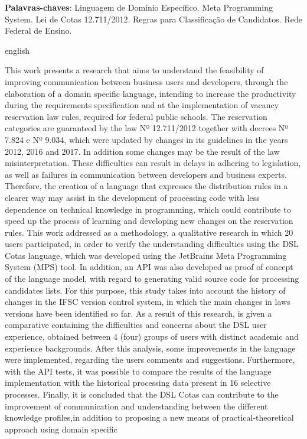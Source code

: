 \begin{resumo}[Resumo]

 \vspace{\onelineskip}
    
 \noindent
 \textbf{Palavras-chaves}: Linguagem de Domínio Específico. Meta Programming System. Lei de Cotas 12.711/2012. Regras para Classificação de Candidatos. Rede Federal de Ensino.
\end{resumo}



\begin{resumo}[Abstract]
\begin{otherlanguage*}{english}

 \noindent
This work presents a research that aims to understand the feasibility of improving communication between business users and developers, through the elaboration of a domain specific language, intending to increase the productivity during the requirements specification and at the implementation of vacancy reservation law rules, required for federal public schools. The reservation categories are guaranteed by the law Nº 12.711/2012 together with decrees Nº 7.824 e Nº 9.034, which were updated by changes in its guidelines in the years 2012, 2016 and 2017. In addition some changes may be the result of the law misinterpretation. These difficulties can result in delays in adhering to legislation, as well as failures in communication between developers and business experts. Therefore, the creation of a language that expresses the distribution rules in a clearer way may assist in the development of processing code with less dependence on technical knowledge in programming, which could contribute to speed up the process of learning and developing new changes on the reservation rules. This work addressed as a methodology, a qualitative research in which 20 users participated, in order to verify the understanding difficulties using the DSL Cotas language, which was developed using the JetBrains Meta Programming System (MPS) tool. In addition, an API was also developed as proof of concept of the language model, with regard to generating valid source code for processing candidates lists. For this purpose, this study takes into account the history of changes in the \gls{IFSC} version control system, in which the main changes in laws versions have been identified so far. As a result of this research, is given a comparative containing the difficulties and concerns about the DSL user experience, obtained between 4 (four) groups of users with distinct academic and experience backgrounds. After this analysis, some improvements in the language were implemented, regarding the users comments and suggestions. Furthermore, with the \gls{API} tests, it was possible to compare the results of the language implementation with the historical processing data present in 16 selective processes. Finally, it is concluded that the DSL Cotas can contribute to the improvement of communication and understanding between the different knowledge profiles,in addition to proposing a new means of practical-theoretical approach using domain specific 
\end{otherlanguage*}
\end{resumo}
